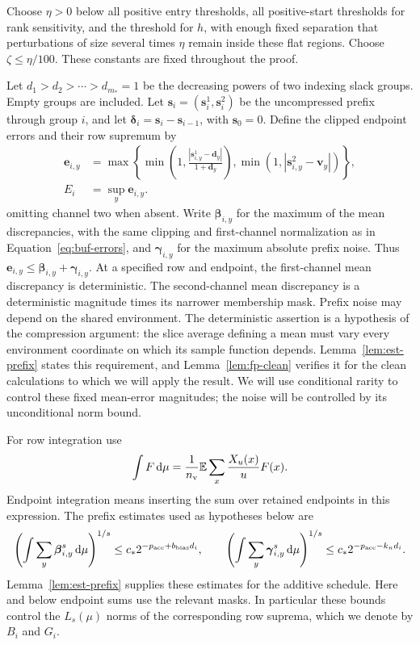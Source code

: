 \documentclass[11pt]{article}
\numberwithin{equation}{section}
\theoremstyle{definition}
\theoremstyle{remark}
\begin{document}
Choose $\eta>0$ below all positive entry thresholds, all positive-start
thresholds for rank sensitivity, and the threshold for $h$, with enough
fixed separation that perturbations of size several times $\eta$ remain
inside these flat regions.  Choose $\zeta\leq\eta/100$.  These constants are
fixed throughout the proof.

Let $d_1>d_2>\cdots>d_{m_*}=1$ be the decreasing powers of two indexing
slack groups.  Empty groups are included.  Let ${\mathbf{s}}_i=({\mathbf{s}}_i^1,{\mathbf{s}}_i^2)$ be the
uncompressed prefix through group $i$, and let
$\boldsymbol{\delta}_i={\mathbf{s}}_i-{\mathbf{s}}_{i-1}$, with ${\mathbf{s}}_0=0$.  Define the clipped endpoint errors
and their row supremum by
\begin{equation}
 \begin{aligned}
 \mathbf e_{i,y}&=\max\left\{
 \min\left(1,\frac{|{\mathbf{s}}^{1}_{i,y}-{\mathbf{d}}_y|}{1+{\mathbf{d}}_y}\right),
 \min(1,|{\mathbf{s}}^{2}_{i,y}-{\mathbf{v}}_y|)\right\},\\
 {E_i}&=\sup_y \mathbf e_{i,y}.
 \end{aligned}
 \label{eq:buf-errors}
\end{equation}
omitting channel two when absent.  Write $\boldsymbol{\beta}_{i,y}$ for the maximum of
the mean discrepancies, with the same clipping and first-channel
normalization as in Equation~\eqref{eq:buf-errors}, and $\boldsymbol{\gamma}_{i,y}$ for
the maximum absolute prefix noise.  Thus
$\mathbf e_{i,y}\leq\boldsymbol{\beta}_{i,y}+\boldsymbol{\gamma}_{i,y}$.  At a specified row and endpoint, the
first-channel mean discrepancy is deterministic.  The second-channel mean
discrepancy is a deterministic magnitude times its narrower membership
mask.  Prefix noise may depend on the shared environment.
The deterministic assertion is a hypothesis of the compression argument:
the slice average defining a mean must vary every environment coordinate
on which its sample function depends.  Lemma~\ref{lem:est-prefix} states
this requirement, and Lemma~\ref{lem:fp-clean} verifies it for the clean
calculations to which we will apply the result.  We will use conditional
rarity to control these fixed mean-error magnitudes; the noise will be
controlled by its unconditional norm bound.

For row integration use
\[
 \int F\,\mathrm d\mu=\frac1{n_{\rm v}}\mathbb E\sum_x\frac{X_u(x)}u F(x).
\]
Endpoint integration means inserting the sum over retained endpoints in
this expression.  The prefix estimates used as hypotheses below are
\begin{equation}
 \left(\int\sum_y\boldsymbol{\beta}_{i,y}^s\,\mathrm d\mu\right)^{1/s}
       \leq c_*2^{-{p_{\rm acc}}+{b_{\rm bias}}d_i},\qquad
 \left(\int\sum_y\boldsymbol{\gamma}_{i,y}^s\,\mathrm d\mu\right)^{1/s}
       \leq c_*2^{-{p_{\rm acc}}-{k}_nd_i}.
 \label{eq:buf-prefix-interface}
\end{equation}
Lemma~\ref{lem:est-prefix} supplies these estimates for the additive
schedule.  Here and below endpoint sums use the relevant masks.  In
particular these bounds control the $L_s(\mu)$ norms of the corresponding
row suprema, which we denote by ${B_i}$ and ${G_i}$.
\end{document}
